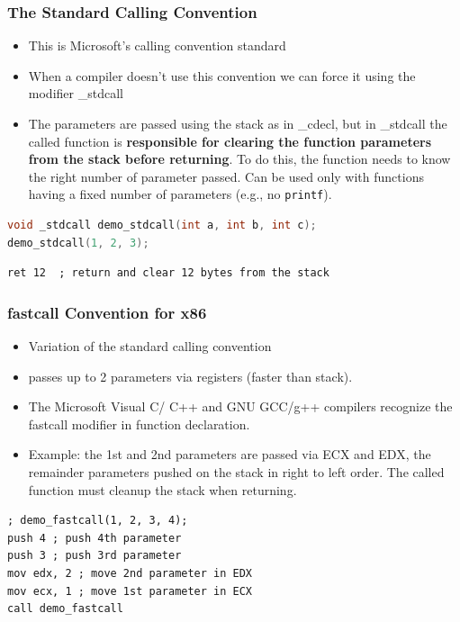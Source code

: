 \documentclass[]{beamer}
\begin{document}
\begin{frame}[fragile]
  \frametitle{The Standard Calling Convention}
  \begin{itemize}
  \item{This is Microsoft's calling convention standard}
  \item{When a compiler doesn't use this convention we can force it using the modifier \color{red}\_stdcall}
  \item{The parameters are passed using the stack as in \_cdecl, but in \_stdcall the called function is \textbf{responsible for clearing the function parameters from the stack before returning}. To do this, the function needs to know the right number of parameter passed. Can be used only with functions having a fixed number of parameters (e.g., no \texttt{printf}).}
  \end{itemize}

\begin{lstlisting}[language=C]
void _stdcall demo_stdcall(int a, int b, int c);
demo_stdcall(1, 2, 3);
\end{lstlisting}
\begin{lstlisting}[language={[x86masm]Assembler}]
ret 12  ; return and clear 12 bytes from the stack
\end{lstlisting}
\end{frame}

\begin{frame}[fragile]
  \frametitle{fastcall Convention for x86}
  \begin{itemize}
  \item{Variation of the standard calling convention}
  \item {passes up to 2 parameters via registers (faster than stack).}
  \item{The Microsoft Visual C/ C++ and GNU GCC/g++ compilers recognize the \color{red}fastcall \color{black} modifier in function declaration.}
  \item{Example: the 1st and 2nd parameters are passed via ECX and EDX, the remainder parameters pushed on the stack in right to left order. The called function must cleanup the stack when returning.}
  \end{itemize}
\begin{lstlisting}[language={[x86masm]Assembler}]
; demo_fastcall(1, 2, 3, 4);
push 4 ; push 4th parameter
push 3 ; push 3rd parameter
mov edx, 2 ; move 2nd parameter in EDX
mov ecx, 1 ; move 1st parameter in ECX
call demo_fastcall
\end{lstlisting}
\end{frame}
\end{document}

